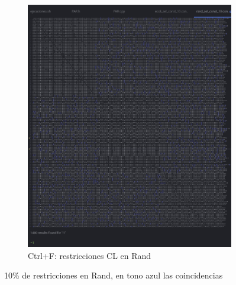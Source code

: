 \documentclass[12pt, spanish]{article}
\begin{document}
\begin{figure}[H]
\begin{subfigure}[b]{0.5\textwidth}
      \includegraphics[scale = 0.28]{rest_rand_10_-1.png}
 		 \caption{Ctrl+F: restricciones CL en Rand}
  		\label{fig:rest_rand_10_-1}
  \end{subfigure}
    \caption{10\% de restricciones en Rand, en tono azul las coincidencias}\label{fig:rest_rand_10}

\end{figure}
\end{document}
